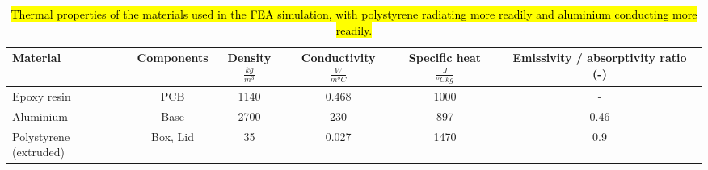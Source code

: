 
\begin{center}
\begin{table}[H]
\centering
\begin{adjustbox}{max width=\textwidth}
  \begin{tabular}{ | l | c | c | c | c | c | }
    \hline
    \textbf{Material} & \textbf{Components} & \textbf{Density $ \frac{kg}{m^3} $ } & \textbf{Conductivity $ \frac{W}{m ^oC} $} &\textbf{Specific heat $ \frac{J}{^oC kg} $} & \textbf{Emissivity / absorptivity  ratio (-)} \\ \hline
    Epoxy resin  & PCB & 1140 & 0.468 & 1000 & -\\ \hline
    Aluminium & Base & 2700 & 230 & 897 & 0.46\\ \hline
    Polystyrene (extruded)  & Box, Lid & 35 & 0.027 & 1470 & 0.9\\ \hline
  \end{tabular}
\end{adjustbox}
\caption{\hl{Thermal properties of the materials used in the FEA simulation, with polystyrene radiating more readily and aluminium conducting more readily.}}
\end{table}
\label{tab: thermal materials}
\end{center}